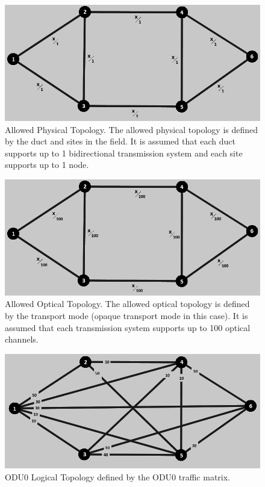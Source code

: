 \begin{figure}[H]
\centering
\includegraphics[width=13cm]{sdf/heuristic/opaque_survivability/medium/allowed_physical_medium}
\caption{Allowed Physical Topology. The allowed physical topology is defined by the duct and sites in the field. It is assumed that each duct supports up to 1 bidirectional transmission system and each site supports up to 1 node.}
\label{allowed_physical_surv_ref_medium_heuristic}
\end{figure}

\begin{figure}[H]
\centering
\includegraphics[width=13cm]{sdf/heuristic/opaque_survivability/medium/allowed_optical_medium}
\caption{Allowed Optical Topology. The allowed optical topology is defined by the transport mode (opaque transport mode in this case). It is assumed that each transmission system supports up to 100 optical channels.}
\label{allowed_optical_surv_ref_medium_heuristic}
\end{figure}

\begin{figure}[H]
\centering
\includegraphics[width=13cm]{sdf/heuristic/opaque_survivability/medium/logical_topology_odu0_medium}
\caption{ODU0 Logical Topology defined by the ODU0 traffic matrix.}
\label{logical_ODU0_surv_ref_medium_heuristic}
\end{figure}

